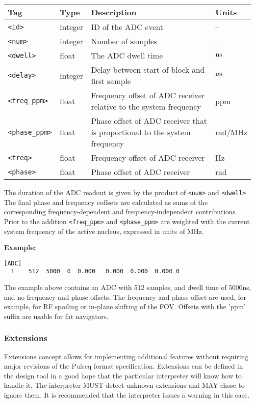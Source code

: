 \documentclass{article}
\begin{document}
\begin{tabularx}{\textwidth}{llXl}
\toprule
Tag & Type & Description & Units\\
\midrule
\verb.<id>. & integer & ID of the ADC event & -- \\
\verb.<num>. & integer & Number of samples & -- \\
\verb.<dwell>. & float & The ADC dwell time & $\rm n s$ \\
\verb.<delay>. & integer & Delay between start of block and first sample & $\rm \mu s$  \\
\verb.<freq_ppm>. & float & Frequency offset of ADC receiver relative to the system frequency & ppm \\
\verb.<phase_ppm>. & float & Phase offset of ADC receiver that is proportional to the system frequency & rad/MHz \\
\verb.<freq>. & float & Frequency offset of ADC receiver & Hz \\
\verb.<phase>. & float & Phase offset of ADC receiver & rad \\
\bottomrule
\end{tabularx}

The duration of the ADC readout is given by the product of \verb.<num>. and \verb.<dwell>. The final phase and frequency coffsets are calculated as sums of the corresponding frequency-dependent and frequency-independent contributions. Prior to the addition \verb.<freq_ppm>. and \verb.<phase_ppm>. are weighted with the current system frequency of the active nucleus, expressed in units of MHz.

\begin{minipage}{\textwidth}
\textbf{Example:}
\begin{lstlisting}
[ADC]
  1    512  5000  0  0.000   0.000  0.000  0.000 0
\end{lstlisting}
\end{minipage}

The example above contains an ADC with 512 samples, and dwell time of 5000ns, and no frequency and phase offsets. The frequency and phase offset are used, for example, for RF spoiling or in-plane shifting of the FOV. Offsets with the 'ppm' suffix are usable for fat navigators.

\subsubsection{Extensions}
Extensions concept allows for implementing additional features without requiring major revisions of the Pulseq format specification. Extensions can be defined in the design tool in a good hope that the particular interpreter will know how to handle it. The interpreter MUST detect unknown extensions and MAY chose to ignore them. It is recommended that the interpreter issues a warning in this case. 
\end{document}

